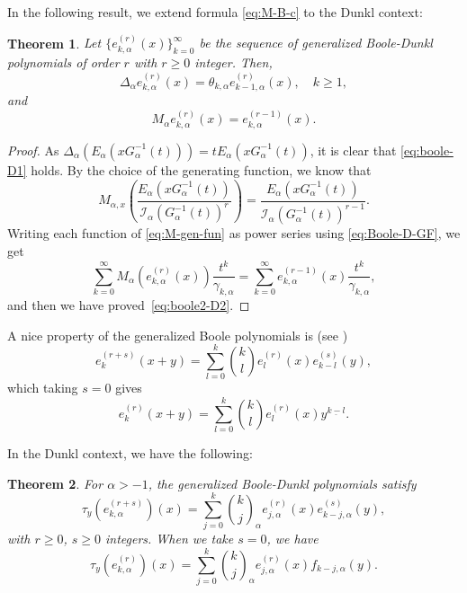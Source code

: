 \documentclass[11pt]{article}
\theoremstyle{plain}
\newtheorem{theorem}{Theorem}[section]
\theoremstyle{remark}
\numberwithin{equation}{section} %
\newcommand{\Ea}{E_{\alpha}}
\newcommand{\binoma}[2]{\binom{#1}{#2}_{\!\alpha}}
\newcommand{\I}{\mathcal{I}}
\begin{document}
In the following result, we extend formula \eqref{eq:M-B-c} to the Dunkl context:

\begin{theorem}
\label{th:B-D-pro}
Let $\{e_{k,\alpha}^{(r)}(x)\}_{k=0}^{\infty}$ be the sequence of generalized Boole-Dunkl polynomials of order $r$ with $r\ge 0$ integer. Then, 
\begin{equation}
\label{eq:boole-D1}
  \Delta_{\alpha} e_{k,\alpha}^{(r)}(x) = \theta_{k,\alpha} e_{k-1,\alpha}^{(r)}(x),
  \quad k \ge 1,
\end{equation}
and
\begin{equation}
\label{eq:boole2-D2}
  M_{\alpha}e^{(r)}_{k,\alpha}(x)
  = e_{k,\alpha}^{(r-1)}(x).
\end{equation}
\end{theorem}

\begin{proof}
As $\Delta_{\alpha}(\Ea(xG_{\alpha}^{-1}(t)))=t\Ea(xG_{\alpha}^{-1}(t))$, it is clear that \eqref{eq:boole-D1} holds. By the choice of the generating function, we know that
\begin{equation}
\label{eq:M-gen-fun}
  M_{\alpha,x}\left(\frac{\Ea(xG_{\alpha}^{-1}(t))}{\I_{\alpha}(G_{\alpha}^{-1}(t))^r}\right)
  = \frac{\Ea(xG_{\alpha}^{-1}(t))}{\I_{\alpha}(G_{\alpha}^{-1}(t))^{r-1}}.
\end{equation}
Writing each function of \eqref{eq:M-gen-fun} as power series using \eqref{eq:Boole-D-GF}, we get
\[
  \sum_{k=0}^{\infty} M_{\alpha}(e^{(r)}_{k,\alpha}(x)) \frac{t^k}{\gamma_{k,\alpha}}
  = \sum_{k=0}^{\infty} e^{(r-1)}_{k,\alpha}(x) \frac{t^k}{\gamma_{k,\alpha}},
\]
and then we have proved~\eqref{eq:boole2-D2}.
\end{proof}

A nice property of the generalized Boole polynomials is (see \cite[(3.15)]{Car})
\begin{equation*}
  e_k^{(r+s)}(x+y) = \sum_{l=0}^k \binom{k}{l}e_l^{(r)}(x)e_{k-l}^{(s)}(y),
\end{equation*}
which taking $s=0$ gives
\begin{equation*}
  e_k^{(r)}(x+y) = \sum_{l=0}^k \binom{k}{l}e_l^{(r)}(x)y^{\underline{k-l}}.
\end{equation*}

In the Dunkl context, we have the following:

\begin{theorem}
For $\alpha>-1$, the generalized Boole-Dunkl polynomials satisfy
\begin{equation}
\label{eq:s0}
  \tau_y(e_{k,\alpha}^{(r+s)})(x)
  = \sum_{j=0}^k\binoma{k}{j}e_{j,\alpha}^{(r)}(x)e_{k-j,\alpha}^{(s)}(y),
\end{equation}
with $r\ge 0$, $s\ge 0$ integers. When we take $s=0$, we have
\begin{equation}
\label{eq:s00}
  \tau_y(e_{k,\alpha}^{(r)})(x)
  = \sum_{j=0}^k\binoma{k}{j}e_{j,\alpha}^{(r)}(x)f_{k-j,\alpha}(y).
\end{equation}
\end{theorem}
\end{document}
